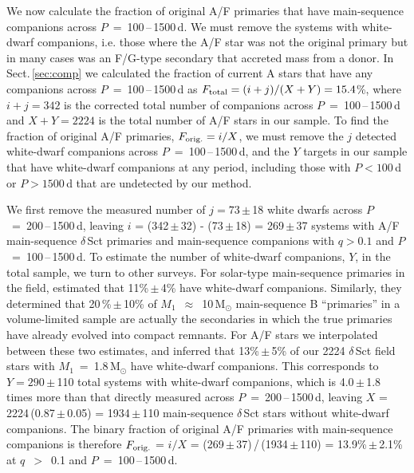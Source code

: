 \documentclass[a4paper,fleqn,usenatbib]{mnras}
\begin{document}
We now calculate the fraction of original A/F primaries that have main-sequence companions across $P$~=~100\,--\,1500\,d. We must remove the systems with white-dwarf companions, i.e. those where the A/F star was not the original primary but in many cases was an F/G-type secondary that accreted mass from a donor. In Sect.\,\ref{sec:comp} we calculated the fraction of current A stars that have any companions across $P$~=~100\,--\,1500\,d as $F_{\rm total} = (i+j)/(X+Y) = 15.4$\%, where $i+j = 342$ is the corrected total number of companions across $P$~=~100\,--\,1500\,d and $X + Y = 2224$ is the total number of A/F stars in our sample. To find the fraction of original A/F primaries, \mbox{$F_{\rm orig.} = i/X$,} we must remove the $j$ detected white-dwarf companions across $P$~=~100\,--\,1500\,d, and the $Y$ targets in our sample that have white-dwarf companions at any period, including those with $P<100$\,d or $P>1500$\,d that are undetected by our method.

We first remove the measured number of $j = 73$\,$\pm$\,18 white dwarfs across $P$~=~200\,--\,1500\,d, leaving $i$ = (342\,$\pm$\,32) - (73\,$\pm$\,18) = 269\,$\pm$\,37 systems with A/F main-sequence $\delta$\,Sct primaries and main-sequence companions with $q > 0.1$ and $P$~=~100\,--\,1500\,d. To estimate the number of white-dwarf companions, $Y$, in the total sample, we turn to other surveys. For solar-type main-sequence primaries in the field, \citet{moe&distefano2017} estimated that 11\%\,$\pm$\,4\% have white-dwarf companions.  Similarly, they determined that 20\,\%\,$\pm$\,10\% of $M_1$~$\approx$~10\,M$_{\odot}$ main-sequence B ``primaries'' in a volume-limited sample are actually the secondaries in which the true primaries have already evolved into compact remnants. For A/F stars we interpolated between these two estimates, and inferred that 13\%\,$\pm$\,5\% of our 2224 $\delta$\,Sct field stars with $M_1$~=~1.8\,M$_{\odot}$ have white-dwarf companions.  This corresponds to $Y = 290$\,$\pm$\,110 total systems with white-dwarf companions, which is 4.0\,$\pm$\,1.8 times more than that directly measured across $P$~=~200\,--\,1500\,d, leaving $X$ = 2224\,(0.87\,$\pm$\,0.05) = 1934\,$\pm$\,110 main-sequence $\delta$\,Sct stars without white-dwarf companions. The binary fraction of original A/F primaries with main-sequence companions is therefore $F_{\rm orig.}$ = $i/X$ = (269\,$\pm$\,37)\,/\,(1934\,$\pm$\,110) = 13.9\%\,$\pm$\,2.1\% at $q$~$>$~0.1 and $P$~=~100\,--\,1500\,d. 
\end{document}
